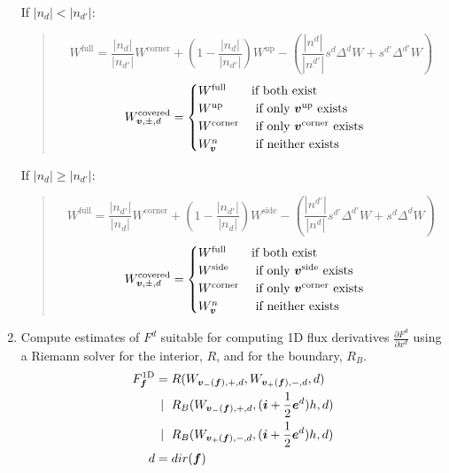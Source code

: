 \begin{enumerate}
If $|n_d| < |n_{d'}|$:
\begin{quotation}
\begin{equation}
W^{\text{full}} = \frac{|n_d|}{|n_{d'}|} W^{\text{corner}} + 
(1-\frac{|n_d|}{|n_{d'}|}) W^{\text{up}} 
- (\frac{|n^{d}|}{|n^{d'}|}s^d \Delta^d W + s^{d'} \Delta^{d'} W) 
\end{equation}
\begin{align}
\begin{split}
W^{\text{covered}}_{{\boldsymbol{v}}, \pm, d} &=  
\begin{cases} 
W^{\text{full}} &  \text{if both exist}  \\
W^{\text{up}} & \text{ if only } {\boldsymbol{v}}^{\text{up}} 
\text{ exists} \\
W^{\text{corner}} & \text{ if only } {\boldsymbol{v}}^{\text{corner}} 
\text{ exists} \\
W^n_{\boldsymbol{v}} & \text{ if neither exists}
\end{cases} 
\end{split}
\label{eqn::coveredinterp2d}
\end{align}
\end{quotation}
If $|n_d| \ge |n_{d'}|$:
\begin{quotation}
\begin{equation}
W^{\text{full}} = \frac{|n_{d'}|}{|n_{d}|} W^{\text{corner}} + 
(1-\frac{|n_{d'}|}{|n_{d}|}) W^{\text{side}} 
- (\frac{|n^{d'}|}{|n^{d}|} s^{d'} \Delta^{d'} W + s^{d} \Delta^{d} W) 
\end{equation}
\begin{align}
\begin{split}
W^{\text{covered}}_{{\boldsymbol{v}}, \pm, d} &=  
\begin{cases} 
 W^{\text{full}} & \text{if both exist} \\
W^{\text{side}} & \text{ if only } {\boldsymbol{v}}^{\text{side}}  \text{ exists} \\
W^{\text{corner}} & \text{ if only } {\boldsymbol{v}}^{\text{corner}} \text{ exists} \\
W^n_{\boldsymbol{v}} & \text{ if neither exists}
\end{cases} 
\end{split}
\end{align}
\end{quotation}

\item Compute estimates of $F^d$ suitable for computing 1D flux
derivatives $\frac{\partial F^d}{\partial x^d}$ using a 
Riemann solver
for the interior, $R$, and for the boundary, $R_B$.
\begin{align}
\begin{split}
F^{\text{1D}}_{\boldsymbol{f}} = 
      & \; R(  W_{{\boldsymbol{v}}_{-}({\boldsymbol{f}}), +, d}, W_{{\boldsymbol{v}}_{+}({\boldsymbol{f}}), -, d}, d) \\
~ | ~ & \; R_B(W_{{\boldsymbol{v}}_{-}({\boldsymbol{f}}), +, d}, ({\boldsymbol{i}} + \frac{1}{2} {\boldsymbol{e}}^d)h  , d) \\
~ | ~ & \; R_B(W_{{\boldsymbol{v}}_{+}({\boldsymbol{f}}), -, d}, ({\boldsymbol{i}} + \frac{1}{2} {\boldsymbol{e}}^d)h  , d) \\
d = & \; dir({\boldsymbol{f}})
\end{split}
\label{eqn::riemann1}
\end{align}


\end{enumerate}
